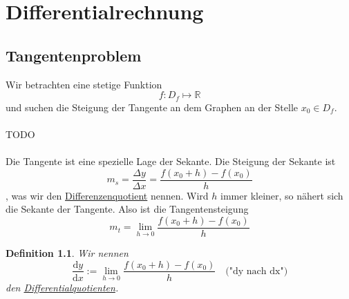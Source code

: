 \documentclass{report}
\newtheorem{mydef}{Definition}
\begin{document}
\chapter{Differentialrechnung}
\section{Tangentenproblem}
Wir betrachten eine stetige Funktion
\begin{equation*}f: D_f \mapsto \mathbb{R}\end{equation*}
und suchen die Steigung der Tangente an dem Graphen an der Stelle $x_0 \in D_f$.
\\\\TODO\\\\
Die Tangente ist eine spezielle Lage der Sekante. Die Steigung der Sekante ist
\begin{equation*}m_s = \frac{\Delta y}{\Delta x} = \frac{f(x_0 + h) - f(x_0)}{h}\end{equation*}
, was wir den \underline{Differenzenquotient} nennen. Wird $h$ immer kleiner, so nähert sich die Sekante der Tangente. Also ist die Tangentensteigung
\begin{equation*}m_t = \lim_{h \to 0} \frac{f(x_0 + h) - f(x_0)}{h}\end{equation*}
\begin{mydef}Wir nennen
\begin{equation*}\frac{\mathrm{d}y}{\mathrm{d}x} := \lim_{h \to 0} \frac{f(x_0 + h) - f(x_0)}{h} \quad \mbox{("dy nach dx")}\end{equation*}
den \underline{Differentialquotienten}.\end{mydef}
\end{document}
